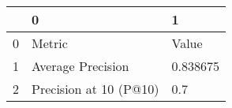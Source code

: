 \begin{tabular}{lll}
\toprule
{} &                       0 &         1 \\
\midrule
0 &                  Metric &     Value \\
1 &       Average Precision &  0.838675 \\
2 &  Precision at 10 (P@10) &       0.7 \\
\bottomrule
\end{tabular}
